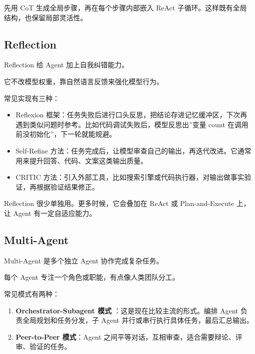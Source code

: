 \documentclass[9pt,a4paper,twocolumn]{ctexart}
\begin{document}
先用 CoT 生成全局步骤，再在每个步骤内部嵌入 ReAct 子循环。这样既有全局结构，也保留局部灵活性。



\subsection*{Reflection}


Reflection 给 Agent 加上自我纠错能力。



它不改模型权重，靠自然语言反馈来强化模型行为。



常见实现有三种：


\begin{itemize}[itemsep=1pt, topsep=2pt]
  \item Reflexion 框架：任务失败后进行口头反思，把结论存进记忆缓冲区，下次再遇到类似问题时参考。比如代码调试失败后，模型反思出”变量 count 在调用前没初始化”，下一轮就能规避。
  \item Self-Refine 方法：任务完成后，让模型审查自己的输出，再迭代改进。它通常用来提升回答、代码、文案这类输出质量。
  \item CRITIC 方法：引入外部工具，比如搜索引擎或代码执行器，对输出做事实验证，再根据验证结果修正。
\end{itemize}


Reflection 很少单独用。更多时候，它会叠加在 ReAct 或 Plan-and-Execute 上，让 Agent 有一定自适应能力。



\subsection*{Multi-Agent}


Multi-Agent 是多个独立 Agent 协作完成复杂任务。



每个 Agent 专注一个角色或职能，有点像人类团队分工。



常见模式有两种：


\begin{enumerate}[itemsep=1pt, topsep=2pt]
  \item \textbf{Orchestrator-Subagent 模式} ：这是现在比较主流的形式。编排 Agent 负责全局规划和任务分发，子 Agent 并行或串行执行具体任务，最后汇总输出。
  \item \textbf{Peer-to-Peer 模式}：Agent 之间平等对话，互相审查，适合需要辩论、评审、验证的任务。
\end{enumerate}
\end{document}

